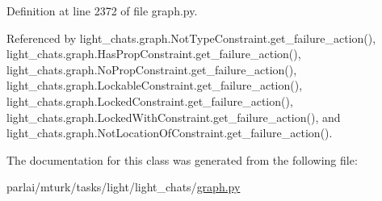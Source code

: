 Definition at line 2372 of file graph.\+py.



Referenced by light\+\_\+chats.\+graph.\+Not\+Type\+Constraint.\+get\+\_\+failure\+\_\+action(), light\+\_\+chats.\+graph.\+Has\+Prop\+Constraint.\+get\+\_\+failure\+\_\+action(), light\+\_\+chats.\+graph.\+No\+Prop\+Constraint.\+get\+\_\+failure\+\_\+action(), light\+\_\+chats.\+graph.\+Lockable\+Constraint.\+get\+\_\+failure\+\_\+action(), light\+\_\+chats.\+graph.\+Locked\+Constraint.\+get\+\_\+failure\+\_\+action(), light\+\_\+chats.\+graph.\+Locked\+With\+Constraint.\+get\+\_\+failure\+\_\+action(), and light\+\_\+chats.\+graph.\+Not\+Location\+Of\+Constraint.\+get\+\_\+failure\+\_\+action().



The documentation for this class was generated from the following file\+:\begin{DoxyCompactItemize}
\item 
parlai/mturk/tasks/light/light\+\_\+chats/\hyperlink{parlai_2mturk_2tasks_2light_2light__chats_2graph_8py}{graph.\+py}\end{DoxyCompactItemize}
